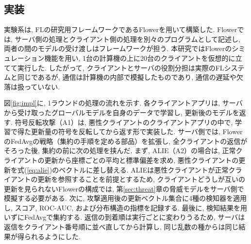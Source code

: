 \documentclass[a4j, twocolumn, dvipdfmx]{jsarticle}
\begin{document}
\subsection{実装}
\label{sec:exp-impl}

実験系は, FLの研究用フレームワークであるFlower\cite{beutel2020flower}を用いて構築した. Flowerでは, サーバ側の処理とクライアント側の処理を別々のプログラムとして記述し, 両者の間のモデルの受け渡しはフレームワークが担う. 本研究ではFlowerのシミュレーション機能を用い, 1台の計算機の上に20台のクライアントを仮想的に立てて実行した. したがって, クライアントとサーバの役割分担は実際のFLシステムと同じであるが, 通信は計算機の内部で模擬したものであり, 通信の遅延や欠落は扱っていない.

図\ref{fig:impl}に, 1ラウンドの処理の流れを示す. 各クライアントアプリは, サーバから受け取ったグローバルモデルを自身のデータで学習し, 更新後のモデルを返す. 符号反転攻撃（A1）は, 悪性クライアントのクライアントアプリの中で, 学習で得た更新量の符号を反転してから返す形で実装した. サーバ側では, FlowerのFedAvgの戦略（集約の手順を定める部品）を拡張し, 全クライアントの返信がそろった後, 集約の前に次の処理を挟んだ. まず, ALIE（A2）の場合は, 正常クライアントの更新から座標ごとの平均と標準偏差を求め, 悪性クライアントの更新を式(\ref{eq:alie})のベクトルに差し替える. ALIEは悪性クライアントが正常クライアントの更新を参照することを前提とするため, クライアントどうしが互いの更新を見られないFlowerの構成では, 第\ref{sec:threat}章の脅威モデルをサーバ側で模擬する必要がある. 次に, 攻撃適用後の更新ベクトル集合に4種の検知器を適用し, スコア, ROC-AUC, および分布構造の指標を記録する. 最後に, 検知結果を用いずにFedAvgで集約する. 返信の到着順は実行ごとに変わりうるため, サーバは返信をクライアント番号順に並べ直してから計算し, 同じ乱数の種からは同じ結果が得られるようにした.
\end{document}
